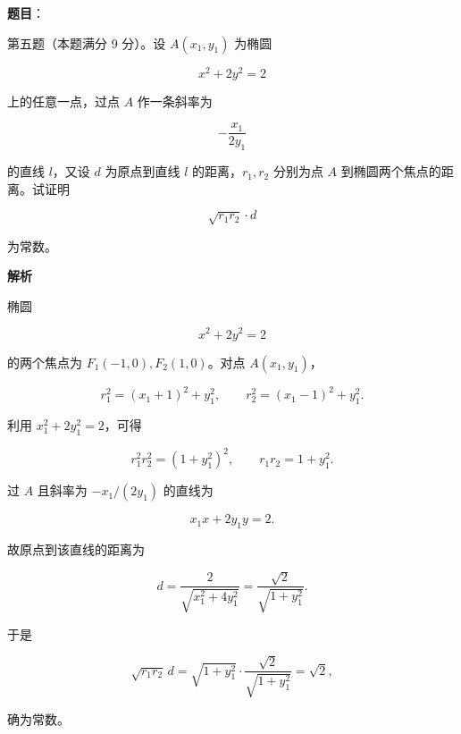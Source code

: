 \begin{answer}

\textbf{题目}：

第五题（本题满分 9 分）。设 $A(x_1,y_1)$ 为椭圆

\nopagebreak[4]
\[
x^2+2y^2=2
\]

上的任意一点，过点 $A$ 作一条斜率为

\nopagebreak[4]
\[
-\frac{x_1}{2y_1}
\]

的直线 $l$，又设 $d$ 为原点到直线 $l$ 的距离，$r_1,r_2$ 分别为点 $A$ 到椭圆两个焦点的距离。试证明

\nopagebreak[4]
\[
\sqrt{r_1r_2}\cdot d
\]

为常数。

\textbf{解析}

椭圆

\nopagebreak[4]
\[
x^2+2y^2=2
\]

的两个焦点为 $F_1(-1,0),F_2(1,0)$。对点 $A(x_1,y_1)$，

\nopagebreak[4]
\[
r_1^2=(x_1+1)^2+y_1^2,\qquad
r_2^2=(x_1-1)^2+y_1^2.
\]

利用 $x_1^2+2y_1^2=2$，可得

\nopagebreak[4]
\[
r_1^2r_2^2=(1+y_1^2)^2,
\qquad
r_1r_2=1+y_1^2.
\]

过 $A$ 且斜率为 $-x_1/(2y_1)$ 的直线为

\nopagebreak[4]
\[
x_1x+2y_1y=2.
\]

故原点到该直线的距离为

\nopagebreak[4]
\[
d=\frac2{\sqrt{x_1^2+4y_1^2}}
=\frac{\sqrt2}{\sqrt{1+y_1^2}}.
\]

于是

\nopagebreak[4]
\[
\sqrt{r_1r_2}\,d
=\sqrt{1+y_1^2}\cdot
\frac{\sqrt2}{\sqrt{1+y_1^2}}
=\sqrt2,
\]

确为常数。


\end{answer}
